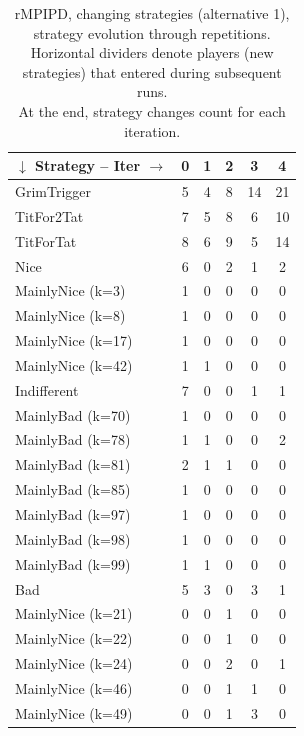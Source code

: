 \documentclass[journal,a4paper,10pt,twoside]{IEEEtran} %
\begin{document}
\begin{table}[ht]
	\caption{rMPIPD, changing strategies (alternative 1), strategy evolution through repetitions.\\
	Horizontal dividers denote players (new strategies) that entered during subsequent runs.\\
	At the end, strategy changes count for each iteration.}
	\label{tab:cripdmp}
	\centering
	\begin{tabular}{l|ccccc} \toprule
		$\downarrow$ Strategy -- Iter $\rightarrow$ & 0 & 1 & 2 & 3 & 4 \\ \midrule
		GrimTrigger       &   5 &   4 &   8 &  14 &  21 \\
		TitFor2Tat        &   7 &   5 &   8 &   6 &  10 \\
		TitForTat         &   8 &   6 &   9 &   5 &  14 \\
		Nice              &   6 &   0 &   2 &   1 &   2 \\
		MainlyNice (k=3)  &   1 &   0 &   0 &   0 &   0 \\
		MainlyNice (k=8)  &   1 &   0 &   0 &   0 &   0 \\
		MainlyNice (k=17) &   1 &   0 &   0 &   0 &   0 \\
		MainlyNice (k=42) &   1 &   1 &   0 &   0 &   0 \\
		Indifferent       &   7 &   0 &   0 &   1 &   1 \\
		MainlyBad (k=70)  &   1 &   0 &   0 &   0 &   0 \\
		MainlyBad (k=78)  &   1 &   1 &   0 &   0 &   2 \\
		MainlyBad (k=81)  &   2 &   1 &   1 &   0 &   0 \\
		MainlyBad (k=85)  &   1 &   0 &   0 &   0 &   0 \\
		MainlyBad (k=97)  &   1 &   0 &   0 &   0 &   0 \\
		MainlyBad (k=98)  &   1 &   0 &   0 &   0 &   0 \\
		MainlyBad (k=99)  &   1 &   1 &   0 &   0 &   0 \\
		Bad               &   5 &   3 &   0 &   3 &   1 \\ \midrule
		MainlyNice (k=21) &   0 &   0 &   1 &   0 &   0 \\
		MainlyNice (k=22) &   0 &   0 &   1 &   0 &   0 \\
		MainlyNice (k=24) &   0 &   0 &   2 &   0 &   1 \\
		MainlyNice (k=46) &   0 &   0 &   1 &   1 &   0 \\
		MainlyNice (k=49) &   0 &   0 &   1 &   3 &   0 \\

\end{tabular}
\end{table}
\end{document}
